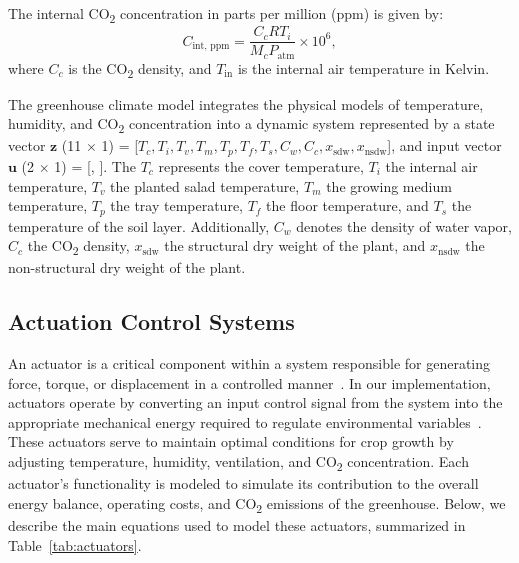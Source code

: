\documentclass[conference]{IEEEtran}
\begin{document}
The internal CO\textsubscript{2} concentration in parts per million (ppm) is given by:
\begin{equation}
    C_{\text{int, ppm}} = \frac{C_c  R  T_i}{M_c  P_{\text{atm}}} \times 10^6,
\end{equation}
where \(C_c\) is the CO\textsubscript{2} density, and \(T_{\text{in}}\) is the internal air temperature in Kelvin.

The greenhouse climate model integrates the physical models of temperature, humidity, and CO\textsubscript{2} concentration into a dynamic system represented by a state vector \(\mathbf{z}\)
(11 \(\times \) 1) = [\(T_c, T_i, T_v, T_m, T_p, T_f, T_s, C_w, C_c, x_{\text{sdw}}, x_{\text{nsdw}}\)], and input vector \(\mathbf{u}\) (2 \(\times \) 1) =
[, ]. The \(T_c\) represents the cover temperature, \(T_i\) the internal air temperature, \(T_v\) the planted salad temperature, \(T_m\) the growing medium temperature, \(T_p\) the tray temperature, \(T_f\) the floor temperature, and \(T_s\) the temperature of the soil layer. Additionally, \(C_w\) denotes the density of water vapor, \(C_c\) the CO\textsubscript{2} density, \(x_{\text{sdw}}\) the structural dry weight of the plant, and \(x_{\text{nsdw}}\) the non-structural dry weight of the plant.

\subsection{Actuation Control Systems}
An actuator is a critical component within a system responsible for generating force, torque, or displacement in a controlled manner~\cite{Escudier2019}. In our implementation, actuators operate by converting an input control signal from the system into the appropriate mechanical energy required to regulate environmental variables~\cite{Butterfield2018}. These actuators serve to maintain optimal conditions for crop growth by
adjusting temperature, humidity, ventilation, and CO\textsubscript{2} concentration. Each actuator's functionality is modeled to simulate its contribution to the overall energy balance, operating costs, and CO\textsubscript{2} emissions of the greenhouse. Below, we describe the main equations used to model these actuators, summarized in Table~\ref{tab:actuators}.
\end{document}
